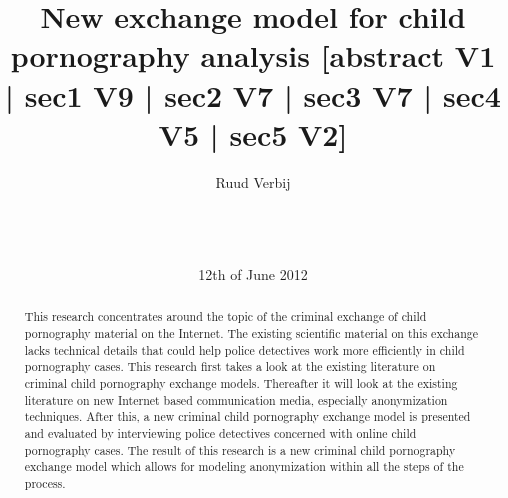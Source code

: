 \documentclass{sig-alternate-br}
\begin{document}
%

\title{New exchange model for child pornography analysis [abstract V1 | sec1 V9 | sec2 V7 | sec3 V7 | sec4 V5 | sec5 V2]}

\author{
\alignauthor
Ruud Verbij \\
       \\
       \\
       \\
}
\date{12th of June 2012}

\maketitle
\begin{abstract}
This research concentrates around the topic of the criminal exchange of child pornography material on the Internet. The existing scientific material on this exchange lacks technical details that could help police detectives work more efficiently in child pornography cases. This research first takes a look at the existing literature on criminal child pornography exchange models. Thereafter it will look at the existing literature on new Internet based communication media, especially anonymization techniques. After this, a new criminal child pornography exchange model is presented and evaluated by interviewing police detectives concerned with online child pornography cases. The result of this research is a new criminal child pornography exchange model which allows for modeling anonymization within all the steps of the process. 
\end{abstract}

\end{document}
